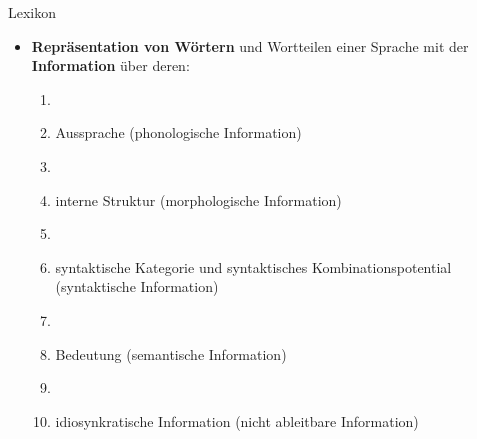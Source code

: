 \begin{frame}{Lexikon}
	
	\begin{itemize}
		\item \textbf{Repräsentation von Wörtern} und Wortteilen einer Sprache mit der \textbf{Information} über deren:

		\begin{enumerate}
			\item[]
			\item Aussprache (phonologische Information)
			\item[]
			\item interne Struktur (morphologische Information)
			\item[]
			\item syntaktische Kategorie und syntaktisches Kombinationspotential (syntaktische Information)
			\item[]
			\item Bedeutung (semantische Information) 
			\item[]
			\item idiosynkratische Information (nicht ableitbare Information)
		\end{enumerate}		  
			
	\end{itemize}
		
\end{frame}


